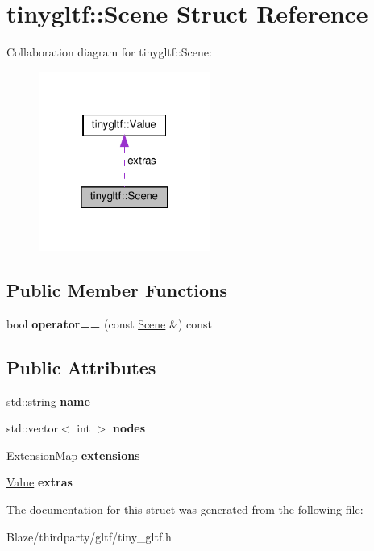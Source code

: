\hypertarget{structtinygltf_1_1Scene}{}\section{tinygltf\+:\+:Scene Struct Reference}
\label{structtinygltf_1_1Scene}


Collaboration diagram for tinygltf\+:\+:Scene\+:\nopagebreak
\begin{figure}[H]
\begin{center}
\leavevmode
\includegraphics[width=160pt]{structtinygltf_1_1Scene__coll__graph}
\end{center}
\end{figure}
\subsection*{Public Member Functions}
\begin{DoxyCompactItemize}
\item 
\mbox{\label{structtinygltf_1_1Scene_adf2f96373dc8338c2b40fba6aa9b60d8}} 
bool {\bfseries operator==} (const \hyperlink{structtinygltf_1_1Scene}{Scene} \&) const
\end{DoxyCompactItemize}
\subsection*{Public Attributes}
\begin{DoxyCompactItemize}
\item 
\mbox{\label{structtinygltf_1_1Scene_a8d1d6dba13157b779451a9229e31915e}} 
std\+::string {\bfseries name}
\item 
\mbox{\label{structtinygltf_1_1Scene_aee7daf789249d91b35b6340a416459bd}} 
std\+::vector$<$ int $>$ {\bfseries nodes}
\item 
\mbox{\label{structtinygltf_1_1Scene_a7476705445d77ab7b1a2070b18038a0e}} 
Extension\+Map {\bfseries extensions}
\item 
\mbox{\label{structtinygltf_1_1Scene_aed651aa4d7c7eb0806a22de2d6ba74c0}} 
\hyperlink{classtinygltf_1_1Value}{Value} {\bfseries extras}
\end{DoxyCompactItemize}


The documentation for this struct was generated from the following file\+:\begin{DoxyCompactItemize}
\item 
Blaze/thirdparty/gltf/tiny\+\_\+gltf.\+h\end{DoxyCompactItemize}
